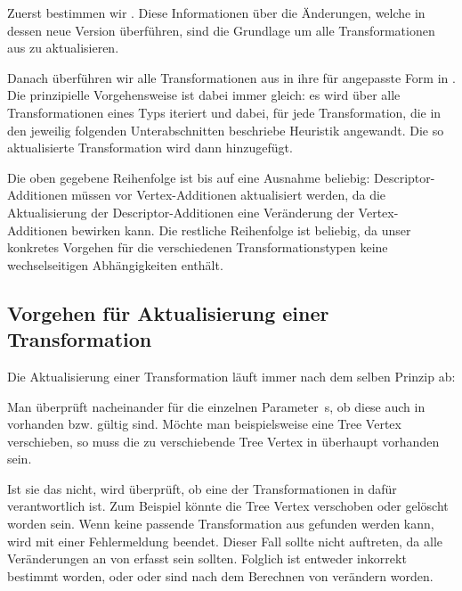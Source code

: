 Zuerst bestimmen wir \code{$\Delta$}. Diese Informationen über die Änderungen, welche  in dessen neue Version  überführen, sind die Grundlage um alle Transformationen aus  zu aktualisieren. \par

Danach überführen wir alle Transformationen aus  in ihre für  angepasste Form in . Die prinzipielle Vorgehensweise ist dabei immer gleich: es wird über alle Transformationen eines Typs iteriert und dabei, für jede Transformation, die in den jeweilig folgenden Unterabschnitten beschriebe Heuristik angewandt. Die so aktualisierte Transformation wird dann  hinzugefügt. \par

Die oben gegebene Reihenfolge ist bis auf eine Ausnahme beliebig: Descriptor-Additionen müssen vor Vertex-Additionen aktualisiert werden, da die Aktualisierung der Descriptor-Additionen eine Veränderung der Vertex-Additionen bewirken kann. Die restliche Reihenfolge ist beliebig, da unser konkretes Vorgehen für die verschiedenen Transformationstypen keine wechselseitigen Abhängigkeiten enthält.\par

\subsection{Vorgehen für Aktualisierung einer Transformation}
Die Aktualisierung einer Transformation  läuft immer nach dem selben Prinzip ab: \par

Man überprüft nacheinander für die einzelnen Parameter \,s, ob diese auch in  vorhanden bzw. gültig sind. Möchte man beispielsweise eine Tree Vertex verschieben, so muss die zu verschiebende Tree Vertex in  überhaupt vorhanden sein. \par

Ist sie das nicht, wird überprüft, ob eine der Transformationen in \code{$\Delta$} dafür verantwortlich ist. Zum Beispiel könnte die Tree Vertex verschoben oder gelöscht worden sein. Wenn keine passende Transformation aus \code{$\Delta$} gefunden werden kann, wird mit einer Fehlermeldung beendet. Dieser Fall sollte nicht auftreten, da alle Veränderungen an  von \code{$\Delta$} erfasst sein sollten. Folglich ist entweder \code{$\Delta$} inkorrekt bestimmt worden, oder  oder  sind nach dem Berechnen von \code{$\Delta$} verändern worden. \par 

